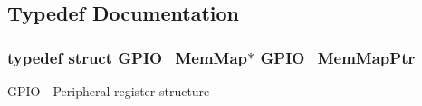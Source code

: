 \subsection{Typedef Documentation}
\hypertarget{group___g_p_i_o___peripheral_ga31c1eddda45aa085f51142987e05ada5}{}
\subsubsection[{G\+P\+I\+O\+\_\+\+Mem\+Map\+Ptr}]{\setlength{\rightskip}{0pt plus 5cm}typedef struct {\bf G\+P\+I\+O\+\_\+\+Mem\+Map}$\ast$ {\bf G\+P\+I\+O\+\_\+\+Mem\+Map\+Ptr}}\label{group___g_p_i_o___peripheral_ga31c1eddda45aa085f51142987e05ada5}
G\+P\+I\+O -\/ Peripheral register structure 